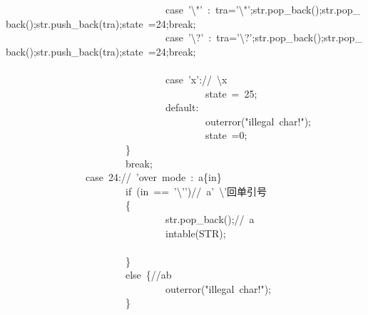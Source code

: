 \documentclass{article}
\begin{document}
\begin{mdpre}
~~~~~~~~~~~~~~~~~~~~~~~~~~~~~~~~{case}~{'}{\textbackslash{}"}{'}~:~tra={'}{\textbackslash{}"}{'};str.pop\_back();str.pop\_back();str.push\_back(tra);state~={24};{break};\\
~~~~~~~~~~~~~~~~~~~~~~~~~~~~~~~~{case}~{'}\textbackslash{}?{'}~:~tra={'}\textbackslash{}?{'};str.pop\_back();str.pop\_back();str.push\_back(tra);state~={24};{break};\\
~~~~~~~~~~~~~~~~~~~~~~~~~~~~~~~~~~~~~~~~~~~~~~~~\\
~~~~~~~~~~~~~~~~~~~~~~~~~~~~~~~~{case}~{'x'}://~\textbackslash{}x\\
~~~~~~~~~~~~~~~~~~~~~~~~~~~~~~~~~~~~~~~~state~=~{25};\\
~~~~~~~~~~~~~~~~~~~~~~~~~~~~~~~~{default}:\\
~~~~~~~~~~~~~~~~~~~~~~~~~~~~~~~~~~~~~~~~outerror({"}{illegal~char!}{"});\\
~~~~~~~~~~~~~~~~~~~~~~~~~~~~~~~~~~~~~~~~state~={0};\\
~~~~~~~~~~~~~~~~~~~~~~~~\}\\
~~~~~~~~~~~~~~~~~~~~~~~~{break};\\
~~~~~~~~~~~~~~~~{case}~{24}://~{'}over~mode~:~a\{in\}\\
~~~~~~~~~~~~~~~~~~~~~~~~{if}~(in~==~{'}{\textbackslash{}'}{'}){//~a'~\textbackslash{}'回单引号}\\
~~~~~~~~~~~~~~~~~~~~~~~~\{\\
~~~~~~~~~~~~~~~~~~~~~~~~~~~~~~~~str.pop\_back();{//~a}\\
~~~~~~~~~~~~~~~~~~~~~~~~~~~~~~~~intable({STR});\\
~~~~~~~~~~~~~~~~~~~~~~~~~~~~~~~~\\
~~~~~~~~~~~~~~~~~~~~~~~~\}\\
~~~~~~~~~~~~~~~~~~~~~~~~{else}~\{{//ab}\\
~~~~~~~~~~~~~~~~~~~~~~~~~~~~~~~~outerror({"}{illegal~char!}{"});\\
~~~~~~~~~~~~~~~~~~~~~~~~\}\\

\end{mdpre}
\end{document}

